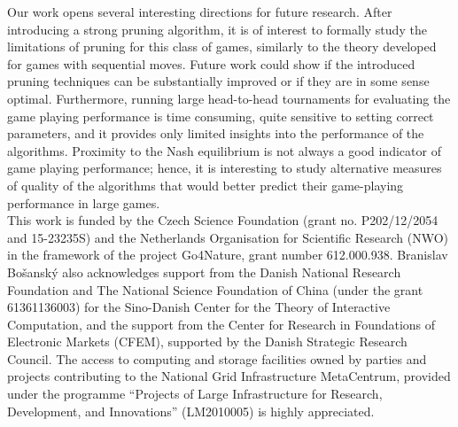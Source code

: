 Our work opens several interesting directions for future research. After introducing a strong pruning algorithm, it is of interest to formally study the limitations of pruning for this class of games, similarly to the theory developed for games with sequential moves. Future work could show if the introduced pruning techniques can be substantially improved or if they are in some sense optimal. 
Furthermore, running large head-to-head tournaments for evaluating the game playing performance is time consuming, quite sensitive to setting correct parameters, and it provides only limited insights into the performance of the algorithms. Proximity to the Nash equilibrium is not always a good indicator of game playing performance; hence, it is interesting to study alternative measures of quality of the algorithms that would better predict their game-playing performance in large games. \\

 This work is funded by the Czech Science Foundation (grant no. P202/12/2054 and 15-23235S) and the Netherlands
Organisation for Scientific Research (NWO) in the framework of the project Go4Nature, grant number 612.000.938.
Branislav Bo{\v s}ansk{\' y} also acknowledges support from the Danish National Research Foundation and The National Science Foundation of China (under the grant 61361136003) for the Sino-Danish Center for the Theory of Interactive Computation, and the support
from the Center for Research in Foundations of Electronic Markets (CFEM), supported by the Danish Strategic Research Council.
The access to computing and storage facilities owned by parties and projects contributing to the National Grid
Infrastructure MetaCentrum, provided under the
programme ``Projects of Large Infrastructure for Research, Development, and Innovations'' (LM2010005) is highly appreciated.

